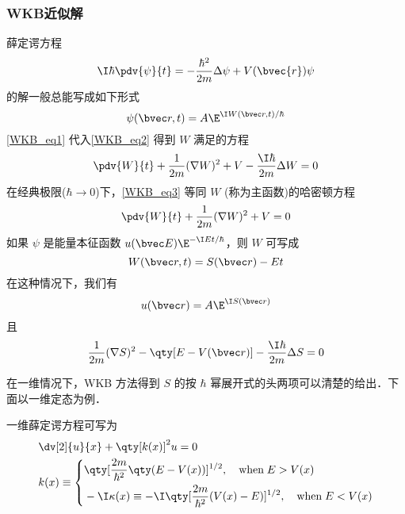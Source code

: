 \subsubsection{WKB近似解}
薛定谔方程
\begin{equation}\label{WKB_eq2}
\I\hbar\pdv{\psi}{t}=-\frac{\hbar^2}{2m}\Delta\psi+V(\bvec{r})\psi
\end{equation}
的解一般总能写成如下形式
\begin{equation}\label{WKB_eq1}
\psi(\bvec r,t)=A\E^{\I W(\bvec r,t)/\hbar}
\end{equation}
\autoref{WKB_eq1} 代入\autoref{WKB_eq2} 得到 $W$ 满足的方程
\begin{equation}\label{WKB_eq3}
\pdv{W}{t}+\frac{1}{2m}(\nabla W)^2+V-\frac{\I\hbar}{2m}\Delta W=0
\end{equation}
在经典极限($\hbar\rightarrow 0$)下，\autoref{WKB_eq3} 等同 $W$ (称为主函数)的哈密顿方程
\begin{equation}
\pdv{W}{t}+\frac{1}{2m}(\nabla W)^2+V=0
\end{equation}
如果 $\psi$ 是能量本征函数 $u(\bvec E)\E^{-\I Et/\hbar}$，则 $W$ 可写成
\begin{equation}
W(\bvec r,t)=S(\bvec r)-Et
\end{equation}
在这种情况下，我们有
\begin{equation}
u(\bvec r)=A\E^{\I S(\bvec r)}
\end{equation}
且
\begin{equation}
\frac{1}{2m}(\nabla S)^2-\qty[E-V(\bvec r)]-\frac{\I\hbar}{2m}\Delta S=0
\end{equation}

在一维情况下，WKB 方法得到 $S$ 的按 $\hbar$ 幂展开式的头两项可以清楚的给出．下面以一维定态为例．

一维薛定谔方程可写为\cite{Sakurai}
\begin{equation}\label{WKB_eq4}
\begin{aligned}
&\dv[2]{u}{x}+\qty[k(x)]^2u=0\\
&k(x)\equiv\left\{\begin{aligned}
&\qty[\frac{2m}{\hbar^2}\qty(E-V(x))]^{1/2},\quad \text{when}\; E>V(x)\\
&-\I\kappa(x)\equiv-\I\qty[\frac{2m}{\hbar^2}(V(x)-E)]^{1/2},\quad \text{when}\; E<V(x)
\end{aligned}\right.
\end{aligned}
\end{equation}

